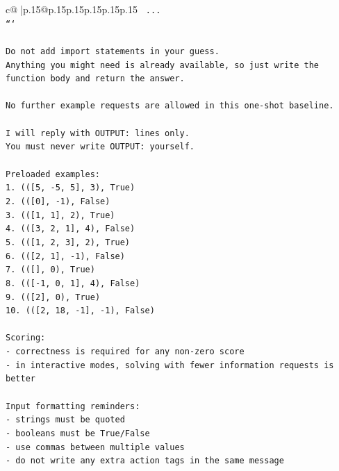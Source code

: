 \documentclass{article}
\begin{document}
{\begin{supertabular}{c@{$\;$}|p{.15\linewidth}@{}p{.15\linewidth}p{.15\linewidth}p{.15\linewidth}p{.15\linewidth}p{.15\linewidth}}
{{{\texttt{    ...} \\
\texttt{```} \\
\\ 
\texttt{Do not add import statements in your guess.} \\
\texttt{Anything you might need is already available, so just write the function body and return the answer.} \\
\\ 
\texttt{No further example requests are allowed in this one{-}shot baseline.} \\
\\ 
\texttt{I will reply with OUTPUT: lines only.} \\
\texttt{You must never write OUTPUT: yourself.} \\
\\ 
\texttt{Preloaded examples:} \\
\texttt{1. (({[}5, {-}5, 5{]}, 3), True)} \\
\texttt{2. (({[}0{]}, {-}1), False)} \\
\texttt{3. (({[}1, 1{]}, 2), True)} \\
\texttt{4. (({[}3, 2, 1{]}, 4), False)} \\
\texttt{5. (({[}1, 2, 3{]}, 2), True)} \\
\texttt{6. (({[}2, 1{]}, {-}1), False)} \\
\texttt{7. (({[}{]}, 0), True)} \\
\texttt{8. (({[}{-}1, 0, 1{]}, 4), False)} \\
\texttt{9. (({[}2{]}, 0), True)} \\
\texttt{10. (({[}2, 18, {-}1{]}, {-}1), False)} \\
\\ 
\texttt{Scoring:} \\
\texttt{{-} correctness is required for any non{-}zero score} \\
\texttt{{-} in interactive modes, solving with fewer information requests is better} \\
\\ 
\texttt{Input formatting reminders:} \\
\texttt{{-} strings must be quoted} \\
\texttt{{-} booleans must be True/False} \\
\texttt{{-} use commas between multiple values} \\
\texttt{{-} do not write any extra action tags in the same message} \\
\\ 
}}}
\end{supertabular}}
\end{document}
